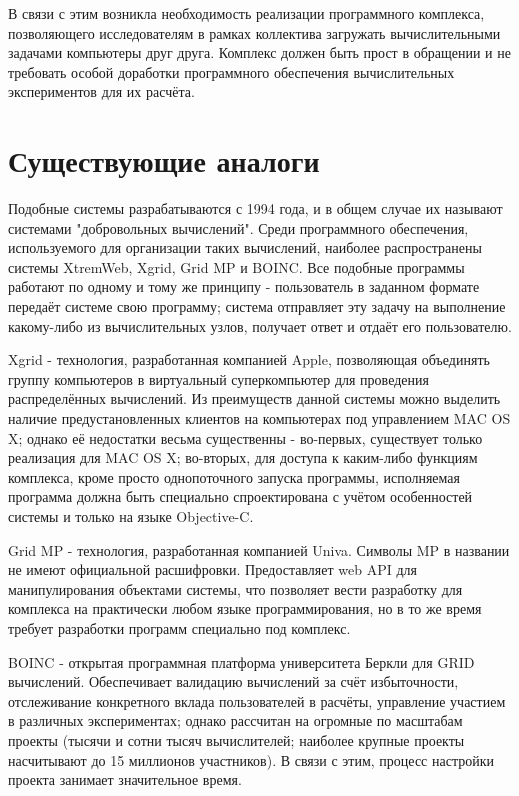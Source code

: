 \documentclass[a4paper,12pt]{report}
\numberwithin{equation}{section}
\begin{document}
В связи с этим возникла необходимость реализации программного комплекса, позволяющего исследователям в рамках коллектива загружать вычислительными задачами компьютеры друг друга.
Комплекс должен быть прост в обращении и не требовать особой доработки программного обеспечения вычислительных экспериментов для их расчёта.

\clearpage
\section{Существующие аналоги}

Подобные системы разрабатываются с 1994 года, и в общем случае их называют системами "добровольных вычислений".
Среди программного обеспечения, используемого для организации таких вычислений, наиболее распространены системы XtremWeb, Xgrid, Grid MP и BOINC.
Все подобные программы работают по одному и тому же принципу - пользователь в заданном формате передаёт системе свою программу; система отправляет эту задачу на выполнение какому-либо из вычислительных узлов, получает ответ и отдаёт его пользователю.

Xgrid - технология, разработанная компанией Apple, позволяющая объединять группу компьютеров в виртуальный суперкомпьютер для проведения распределённых вычислений. 
Из преимуществ данной системы можно выделить наличие предустановленных клиентов на компьютерах под управлением MAC OS X; однако её недостатки весьма существенны - во-первых, существует только реализация для MAC OS X; во-вторых, для доступа к каким-либо функциям комплекса, кроме просто однопоточного запуска программы, исполняемая программа должна быть специально спроектирована с учётом особенностей системы и только на языке Objective-C.

Grid MP - технология, разработанная компанией Univa. Символы MP в названии не имеют официальной расшифровки. 
Предоставляет web API для манипулирования объектами системы, что позволяет вести разработку для комплекса на практически любом языке программирования, но в то же время требует разработки программ специально под комплекс.

BOINC - открытая программная платформа университета Беркли для GRID вычислений. 
Обеспечивает валидацию вычислений за счёт избыточности, отслеживание конкретного вклада пользователей в расчёты, управление участием в различных экспериментах; однако рассчитан на огромные по масштабам проекты (тысячи и сотни тысяч вычислителей; наиболее крупные проекты насчитывают до 15 миллионов участников). 
В связи с этим, процесс настройки проекта занимает значительное время.
\end{document}
